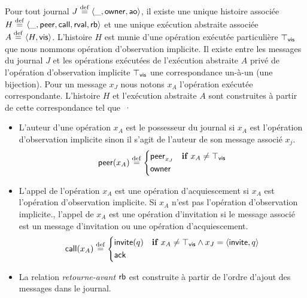 \begin{definition}\label{def:exec-abs-log}
Pour tout journal $J \defeq \tuple*{\_, \trm{owner}, \trm{ao}}$, il existe une unique histoire associée $H \defeq \tuple*{\_, \trm{peer}, \trm{call}, \trm{rval}, \trm{rb}}$ et une unique exécution abstraite associée $A \defeq \tuple*{H, \trm{vis}}$.
L'histoire $H$ est munie d'une opération exécutée particulière $\top_{\trm{vis}}$ que nous nommons opération d'observation implicite.
Il existe entre les messages du journal $J$ et les opérations exécutées de l'exécution abstraite $A$ privé de l'opération d'observation implicite $\top_{\trm{vis}}$ une correspondance un-à-un (une bijection).
Pour un message $x_J$ nous notons $x_A$ l'opération exécutée correspondante.
L'histoire $H$ et l'exécution abstraite $A$ sont construites à partir de cette correspondance tel que~·
\begin{itemize}
\item L'auteur d'une opération $x_A$ est le possesseur du journal si $x_A$ est l'opération d'observation implicite sinon il s'agit de l'auteur de son message associé $x_j$.
\begin{equation*}
    \trm{peer}(x_A) \defeq \begin{dcases}
        \trm{peer}_{x_J} & \when x_A \neq \top_{\trm{vis}}\\
        \trm{owner} &
    \end{dcases}
\end{equation*}
\item L'appel de l'opération $x_A$ est une opération d'acquiescement si $x_A$ est l'opération d'observation implicite.
Si $x_A$ n'est pas l'opération d'observation implicite., l'appel de $x_A$ est une opération d'invitation si le message associé est un message d'invitation ou une opération d'acquiescement.
\begin{equation*}
    \trm{call}(x_A) \defeq \begin{dcases}
        \trm{invite}(q) & \when x_A \neq \top_{\trm{vis}} \land x_J = \tuple*{\trm{invite}, q}\\
        \trm{ack} &
    \end{dcases}
\end{equation*}
\item La relation \emph{retourne-avant} $\trm{rb}$ est construite à partir de l'ordre d'ajout des messages dans le journal.

\end{itemize}
\end{definition}
